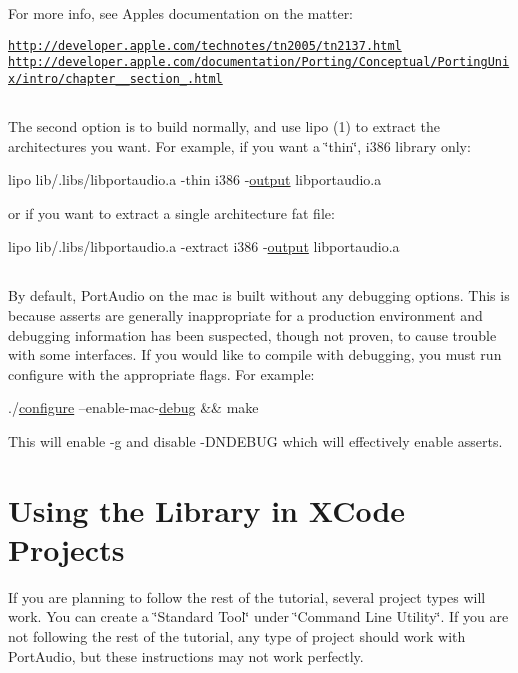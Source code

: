 For more info, see Apple\textquotesingle{}s documentation on the matter\+:

\href{http://developer.apple.com/technotes/tn2005/tn2137.html}{\tt http\+://developer.\+apple.\+com/technotes/tn2005/tn2137.\+html} \href{http://developer.apple.com/documentation/Porting/Conceptual/PortingUnix/intro/chapter_1_section_1.html}{\tt http\+://developer.\+apple.\+com/documentation/\+Porting/\+Conceptual/\+Porting\+Unix/intro/chapter\+\_\+\_\+section\+\_.\+html}\hypertarget{_}{}\subsection{}\label{_}
The second option is to build normally, and use lipo (1) to extract the architectures you want. For example, if you want a \char`\"{}thin\char`\"{}, i386 library only\+:


\begin{DoxyCode}
lipo lib/.libs/libportaudio.a -thin i386 -\hyperlink{namespacelv2specgen_a653e2b7722801dea4d25040ac958b631}{output} libportaudio.a
\end{DoxyCode}


or if you want to extract a single architecture fat file\+:


\begin{DoxyCode}
lipo lib/.libs/libportaudio.a -extract i386 -\hyperlink{namespacelv2specgen_a653e2b7722801dea4d25040ac958b631}{output} libportaudio.a
\end{DoxyCode}
\hypertarget{_}{}\subsection{}\label{_}
By default, Port\+Audio on the mac is built without any debugging options. This is because asserts are generally inappropriate for a production environment and debugging information has been suspected, though not proven, to cause trouble with some interfaces. If you would like to compile with debugging, you must run configure with the appropriate flags. For example\+:


\begin{DoxyCode}
./\hyperlink{namespacewaflib_1_1extras_1_1autowaf_aed9c0237757b6bbcc7a442d726e82c47}{configure} --enable-mac-\hyperlink{src_2flac_2main_8c_a6f11ce505641910527169e5b39d693cc}{debug} && make
\end{DoxyCode}


This will enable -\/g and disable -\/\+D\+N\+D\+E\+B\+UG which will effectively enable asserts.\hypertarget{compile_mac_coreaudio_comp_mac_ca_4}{}\section{Using the Library in X\+Code Projects}\label{compile_mac_coreaudio_comp_mac_ca_4}
If you are planning to follow the rest of the tutorial, several project types will work. You can create a \char`\"{}\+Standard Tool\char`\"{} under \char`\"{}\+Command Line Utility\char`\"{}. If you are not following the rest of the tutorial, any type of project should work with Port\+Audio, but these instructions may not work perfectly.

